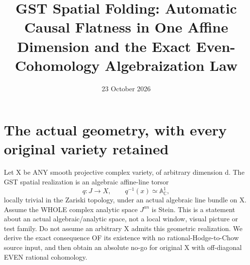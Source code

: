 \documentclass[11pt]{article}
\title{GST Spatial Folding: Automatic Causal Flatness in One Affine Dimension and the Exact Even-Cohomology Algebraization Law}
\date{23 October 2026}
\begin{document}
\maketitle

\section{The actual geometry, with every original variety retained}
Let X be ANY smooth projective complex variety, of arbitrary dimension d.
The GST spatial realization is an algebraic affine-line torsor
\[
    q:J\longrightarrow X, \qquad q^{-1}(x)\simeq\mathbb A^1_{\mathbb C},
    \tag{1}
\]
locally trivial in the Zariski topology, under an actual algebraic line
bundle on X. Assume the WHOLE complex analytic space $J^{an}$ is Stein.
This is a statement about an actual algebraic/analytic space, not
a local window, visual picture or test family. Do not assume
an arbitrary X admits this geometric realization. We derive the
exact consequence OF its existence with no rational-Hodge-to-Chow
source input, and then obtain an absolute no-go for original X
with off-diagonal EVEN rational cohomology.
\end{document}
